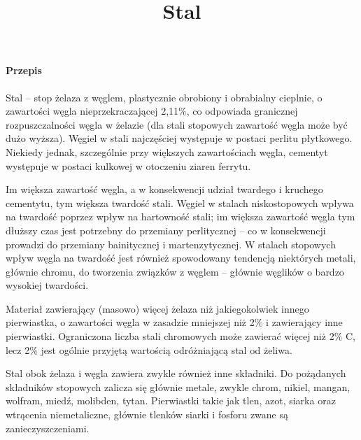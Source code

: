 \documentclass{article}
\title{\Huge{Stal}}
\date{}
\newcommand{\paragraphx}[1]{
        \paragraph{\Large{{#1}}}\mbox{}

    }
\begin{document}
    \maketitle

    \paragraphx{Przepis}
    Stal – stop żelaza z węglem, plastycznie obrobiony i obrabialny cieplnie, o zawartości węgla nieprzekraczającej 2,11$\%$, co odpowiada granicznej rozpuszczalności węgla w żelazie (dla stali stopowych zawartość węgla może być dużo wyższa). Węgiel w stali najczęściej występuje w postaci perlitu płytkowego. Niekiedy jednak, szczególnie przy większych zawartościach węgla, cementyt występuje w postaci kulkowej w otoczeniu ziaren ferrytu.

    Im większa zawartość węgla, a w konsekwencji udział twardego i kruchego cementytu, tym większa twardość stali. Węgiel w stalach niskostopowych wpływa na twardość poprzez wpływ na hartowność stali; im większa zawartość węgla tym dłuższy czas jest potrzebny do przemiany perlitycznej – co w konsekwencji prowadzi do przemiany bainitycznej i martenzytycznej. W stalach stopowych wpływ węgla na twardość jest również spowodowany tendencją niektórych metali, głównie chromu, do tworzenia związków z węglem – głównie węglików o bardzo wysokiej twardości.
    
    Materiał zawierający (masowo) więcej żelaza niż jakiegokolwiek innego pierwiastka, o zawartości węgla w zasadzie mniejszej niż 2$\%$ i zawierający inne pierwiastki. Ograniczona liczba stali chromowych może zawierać więcej niż 2$\%$ C, lecz 2$\%$ jest ogólnie przyjętą wartością odróżniającą stal od żeliwa.
    
    Stal obok żelaza i węgla zawiera zwykle również inne składniki. Do pożądanych składników stopowych zalicza się głównie metale, zwykle chrom, nikiel, mangan, wolfram, miedź, molibden, tytan. Pierwiastki takie jak tlen, azot, siarka oraz wtrącenia niemetaliczne, głównie tlenków siarki i fosforu zwane są zanieczyszczeniami.

    
\end{document}
